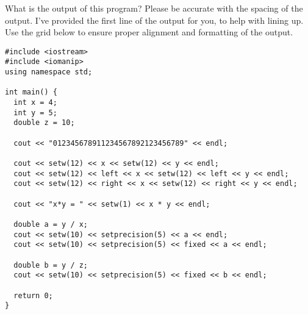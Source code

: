 \documentclass[11pt,answers]{exam}
\begin{document}
\begin{questions}
\begin{parts}
\end{parts}

\newpage
\question[20] What is the output of this program? Please be accurate with the spacing of the output. I've provided the first line of the output for you, to help with lining up. Use the grid below to ensure proper alignment and formatting of the output.

\begin{lstlisting}
#include <iostream>
#include <iomanip>
using namespace std;

int main() {
  int x = 4;
  int y = 5;
  double z = 10;
  
  cout << "012345678911234567892123456789" << endl;
  
  cout << setw(12) << x << setw(12) << y << endl;
  cout << setw(12) << left << x << setw(12) << left << y << endl;
  cout << setw(12) << right << x << setw(12) << right << y << endl;
  
  cout << "x*y = " << setw(1) << x * y << endl;
  
  double a = y / x;
  cout << setw(10) << setprecision(5) << a << endl;
  cout << setw(10) << setprecision(5) << fixed << a << endl;
  
  double b = y / z;
  cout << setw(10) << setprecision(5) << fixed << b << endl;
  
  return 0;
}
\end{lstlisting}



\end{questions}
\end{document}
